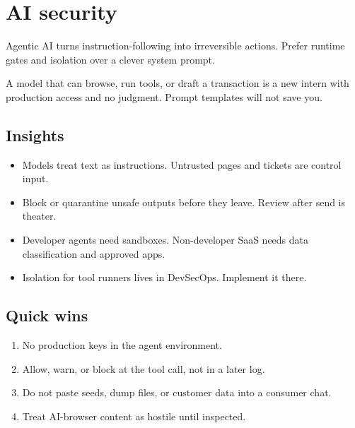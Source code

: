\chapter{AI security}

Agentic AI turns instruction-following into irreversible
actions. Prefer runtime gates and isolation over a
clever system prompt.

A model that can browse, run tools, or draft a
transaction is a new intern with production access and
no judgment. Prompt templates will not save you.

\section{Insights}

\begin{itemize}
  \item Models treat text as instructions. Untrusted
  pages and tickets are control input.
  \item Block or quarantine unsafe outputs before they
  leave. Review after send is theater.
  \item Developer agents need sandboxes. Non-developer
  SaaS needs data classification and approved apps.
  \item Isolation for tool runners lives in DevSecOps.
  Implement it there.
\end{itemize}

\section{Quick wins}

\begin{enumerate}
  \item No production keys in the agent environment.
  \item Allow, warn, or block at the tool call, not in
  a later log.
  \item Do not paste seeds, dump files, or customer data
  into a consumer chat.
  \item Treat AI-browser content as hostile until
  inspected.
\end{enumerate}

